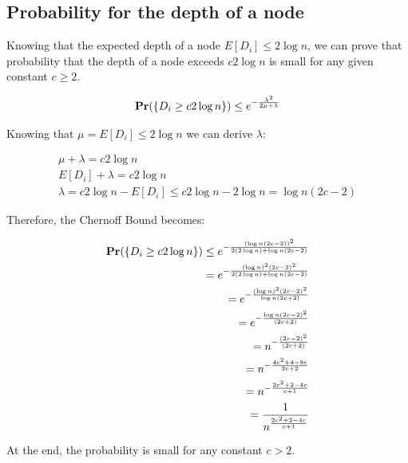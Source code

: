 \documentclass{article}
\begin{document}
\subsection{Probability for the depth of a node}

\noindent Knowing that the expected depth of a node $E[D_i] \le 2 \log n$, we can prove that probability that the depth
of a node exceeds $c 2 \log n$ is small for any given constant $c \ge 2$.

\begin{align}
    \textrm{\textbf{Pr}}(\{D_i \ge c 2 \log n\}) \le e^{-\frac{\lambda^2}{2 \mu + \lambda}}
\end{align}

\noindent Knowing that $\mu = E[D_i] \le 2 \log n$ we can derive $\lambda$:

\begin{align*}
    \mu + \lambda = c 2 \log n \\
    E[D_i] + \lambda = c 2 \log n \\
    \lambda = c 2 \log n - E[D_i] \le c2 \log n - 2 \log n = \log n(2c - 2)
\end{align*}

\noindent Therefore, the Chernoff Bound becomes:

\begin{align*}
    \textrm{\textbf{Pr}}(\{D_i \ge c 2 \log n\}) \le e^{-\frac{(\log n(2c - 2))^2}{2(2 \log n) + \log n(2c - 2)}} \\
    = e^{-\frac{(\log n)^2 (2c-2)^2}{2(2 \log n) + \log n (2c - 2)}} \\
    = e^{-\frac{(\log n)^2 (2c-2)^2}{\log n (2c + 2)}} \\
    = e^{-\frac{\log n (2c-2)^2}{(2c + 2)}} \\
    = n^{-\frac{(2c-2)^2}{(2c + 2)}} \\
    = n^{-\frac{4c^2 + 4 - 8c}{2c + 2}} \\
    = n^{-\frac{2c^2 + 2 - 4c}{c + 1}} \\
    = \frac{1}{n^{\frac{2c^2 + 2 - 4c}{c + 1}}}
\end{align*}

At the end, the probability is small for any constant $c > 2$.
\end{document}
